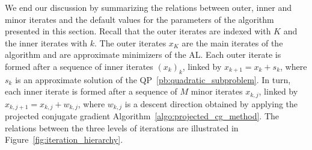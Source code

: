 \documentclass{article}
\numberwithin{equation}{section}
\theoremstyle{plain}
\begin{document}
	We end our discussion by summarizing the relations between outer, inner and minor iterates and the default values for the parameters of the algorithm presented in this section. Recall that the outer iterates are indexed with $K$ and the inner iterates with $k$.
	The outer iterates $x_K$ are the main iterates of the algorithm and are approximate minimizers of the AL. Each outer iterate is formed after a sequence of inner iterates $(x_k)_k$, linked by $x_{k+1}=x_k+s_k$, where $s_k$ is an approximate solution of the QP~\eqref{pb:quadratic_subproblem}. In turn, each inner iterate is formed after a sequence of $M$ minor iterates $x_{k,j}$, linked by $x_{k,j+1}=x_{k,j}+w_{k,j}$, where $w_{k,j}$ is a descent direction obtained by applying the projected conjugate gradient Algorithm~\ref{algo:projected_cg_method}. 
	The relations between the three levels of iterations are illustrated in Figure~\ref{fig:iteration_hierarchy}.
\end{document}

